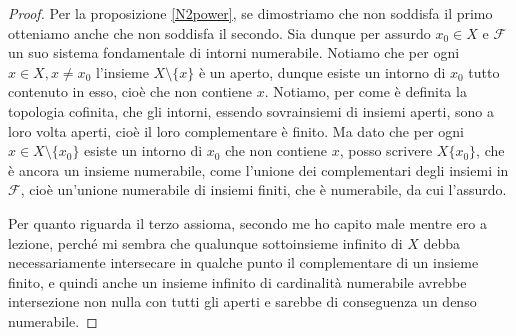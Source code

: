 \documentclass{article}
\begin{document}
\begin{proof}
	Per la proposizione \ref{N2power}, se dimostriamo che non soddisfa il primo otteniamo anche che non soddisfa il secondo. Sia dunque per assurdo $x_0 \in X$ e $\mathcal{F}$ un suo sistema fondamentale di intorni numerabile. Notiamo che per ogni $x \in X, x\not=x_0$ l'insieme $X \setminus \{ x\}$ è un aperto, dunque esiste un intorno di $x_0$ tutto contenuto in esso, cioè che non contiene $x$. Notiamo, per come è definita la topologia cofinita, che gli intorni, essendo sovrainsiemi di insiemi aperti, sono a loro volta aperti, cioè il loro complementare è finito. Ma dato che per ogni $x \in X \setminus \{ x_0\}$ esiste un intorno di $x_0$ che non contiene $x$, posso scrivere $X \{ x_0\}$, che è ancora un insieme numerabile, come
	l'unione dei complementari degli insiemi in $\mathcal{F}$, cioè un'unione numerabile di insiemi finiti, che è numerabile, da cui l'assurdo.

	Per quanto riguarda il terzo assioma, secondo me ho capito male mentre ero a lezione, perché mi sembra che qualunque sottoinsieme infinito di $X$ debba necessariamente intersecare in qualche punto il complementare di un insieme finito, e quindi anche un insieme infinito di cardinalità numerabile avrebbe intersezione non nulla con tutti gli aperti e sarebbe di conseguenza un denso numerabile.
\end{proof}
\end{document}
